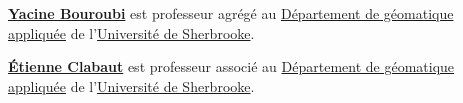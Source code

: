 \documentclass[
]{article}
\begin{document}
\href{https://www.usherbrooke.ca/geomatique/departement/personnel/personnel-enseignant/yacine-bouroubi}{\textbf{Yacine
Bouroubi}} est professeur agrégé au
\href{https://www.usherbrooke.ca/geomatique/}{Département de géomatique
appliquée} de l'\href{https://www.usherbrooke.ca/}{Université de
Sherbrooke}.

\href{https://www.linkedin.com/in/\%C3\%A9tienne-clabaut-793a4176/?originalSubdomain=ca}{\textbf{Étienne
Clabaut}} est professeur associé au
\href{https://www.usherbrooke.ca/geomatique/}{Département de géomatique
appliquée} de l'\href{https://www.usherbrooke.ca/}{Université de
Sherbrooke}.
\end{document}
